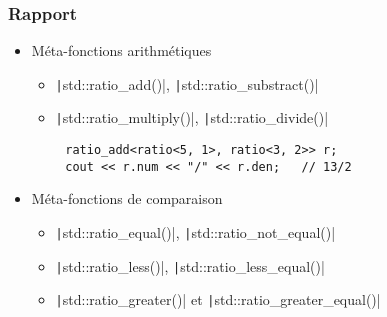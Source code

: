 \documentclass[C++.tex]{subfiles}
\begin{document}
\begin{frame}[fragile]
	\frametitle{Rapport}
	\begin{itemize}
		\item Méta-fonctions arithmétiques
		\begin{itemize}
			\item \texttt|std::ratio_add()|, \texttt|std::ratio_substract()|
			\item \texttt|std::ratio_multiply()|, \texttt|std::ratio_divide()|
		\end{itemize}

	\end{itemize}

	\begin{verbatim}
		ratio_add<ratio<5, 1>, ratio<3, 2>> r;
		cout << r.num << "/" << r.den;   // 13/2
	\end{verbatim}

	\begin{itemize}
		\item Méta-fonctions de comparaison
		\begin{itemize}
			\item \texttt|std::ratio_equal()|, \texttt|std::ratio_not_equal()|
			\item \texttt|std::ratio_less()|, \texttt|std::ratio_less_equal()|
			\item \texttt|std::ratio_greater()| et \texttt|std::ratio_greater_equal()|
		\end{itemize}
	\end{itemize}


\end{frame}
\end{document}
